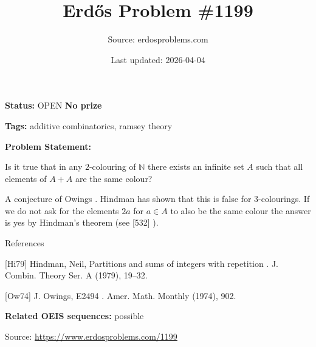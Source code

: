 \documentclass{article}
\title{Erd\H{o}s Problem \#1199}
\date{Last updated: 2026-04-04}
\author{Source: erdosproblems.com}
\begin{document}
\maketitle

\noindent\textbf{Status:} OPEN \quad \textbf{No prize}

\noindent\textbf{Tags:} additive combinatorics, ramsey theory

\medskip

\noindent\textbf{Problem Statement:}

Is it true that in any $2$-colouring of $\mathbb{N}$ there exists an infinite set $A$ such that all elements of $A+A$ are the same colour?




A conjecture of Owings \cite{Ow74}. Hindman \cite{Hi79} has shown that this is false for $3$-colourings. If we do not ask for the elements $2a$ for $a\in A$ to also be the same colour the answer is yes by Hindman's theorem (see [532] ).




References

[Hi79] Hindman, Neil, Partitions and sums of integers with repetition . J. Combin. Theory Ser. A (1979), 19--32.

[Ow74] J. Owings, E2494 . Amer. Math. Monthly (1974), 902.

\noindent\textbf{Related OEIS sequences:} possible


\bigskip
\noindent\small{Source: \url{https://www.erdosproblems.com/1199}}
\end{document}
